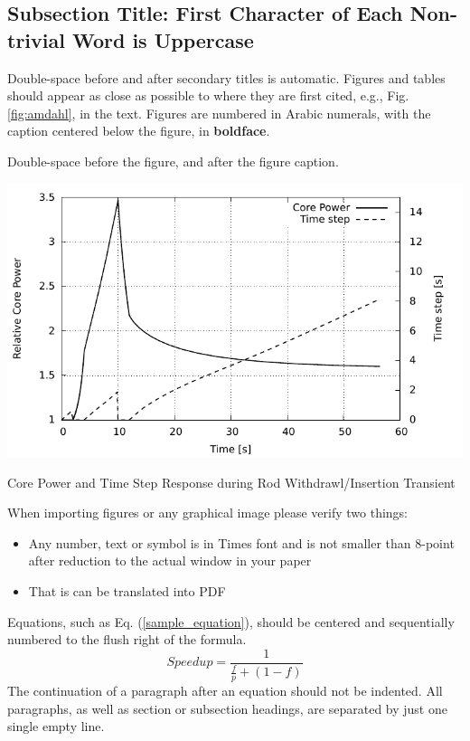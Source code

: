 \documentclass{ansconf}
\begin{document}
\begin{multicols}{2}
\subsection{Subsection Title: First Character of Each Non-trivial Word is 
Uppercase} 
\label{sec:second}

Double-space before and after secondary titles is automatic.  Figures and 
tables should appear as close as possible to where they are first
cited, e.g., Fig. \ref{fig:amdahl}, in the text.  Figures are numbered in 
Arabic numerals, with the caption centered below the figure, in 
{\bf boldface}.
  
Double-space before the figure, and after the figure caption.

%
\vspace{8pt}
\begin{figurehere}
\begin{spacing}{1.0}
\centering
\includegraphics[scale=0.65]{figure}
\caption{\small Core Power and Time Step Response during Rod 
          Withdrawl/Insertion Transient}
\label{fig:amdahl}
\end{spacing}
\end{figurehere}
\vspace{8pt}
%

When importing figures or any graphical image please verify two things:
\begin{itemize}
\item Any number, text or symbol is in Times font and is not smaller than 
    8-point after reduction to the actual window in your paper
\item That is can be translated into PDF
\end{itemize}


Equations, such as Eq. (\ref{sample_equation}), should be centered and 
sequentially numbered to the flush right of the formula.
\begin{equation}
  \label{sample_equation}
  Speedup = \frac{1}{\frac{f}{p} + (1-f)}
\end{equation}
The continuation of a paragraph after an equation should not be indented.  
All paragraphs, as well as section or subsection headings, are separated by 
just one single empty line.



\end{multicols}
\end{document}
